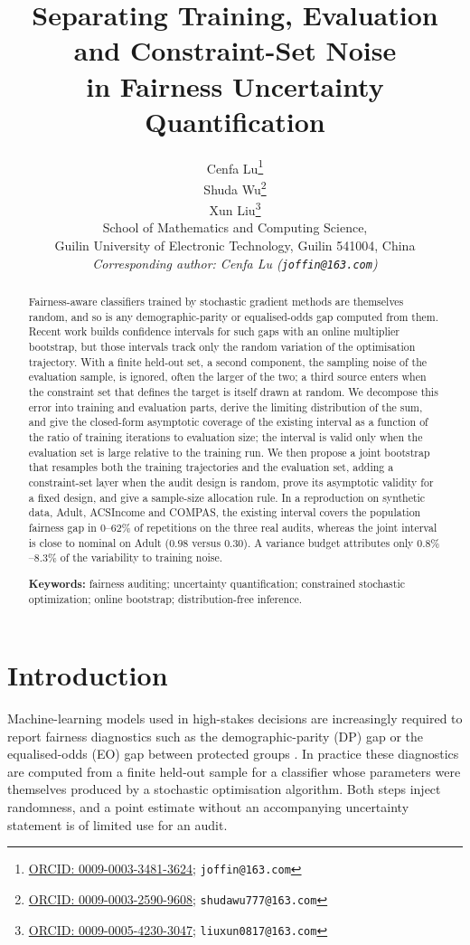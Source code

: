 \documentclass[11pt]{article}
\title{Separating Training, Evaluation and Constraint-Set Noise\\in Fairness Uncertainty Quantification}
\author{Cenfa Lu\thanks{\href{https://orcid.org/0009-0003-3481-3624}{ORCID: 0009-0003-3481-3624}; \texttt{joffin@163.com}}\\
Shuda Wu\thanks{\href{https://orcid.org/0009-0003-2590-9608}{ORCID: 0009-0003-2590-9608}; \texttt{shudawu777@163.com}}\\
Xun Liu\thanks{\href{https://orcid.org/0009-0005-4230-3047}{ORCID: 0009-0005-4230-3047}; \texttt{liuxun0817@163.com}}\\
School of Mathematics and Computing Science,\\
Guilin University of Electronic Technology, Guilin 541004, China\\
\textit{Corresponding author: Cenfa Lu (\texttt{joffin@163.com})}}
\date{}
\begin{document}
\maketitle

\begin{abstract}
Fairness-aware classifiers trained by stochastic gradient methods are themselves random, and so is any
demographic-parity or equalised-odds gap computed from them.  Recent work builds confidence intervals
for such gaps with an online multiplier bootstrap, but those intervals track only the random variation
of the optimisation trajectory.  With a finite held-out set, a second component, the sampling noise of
the evaluation sample, is ignored, often the larger of the two; a third source enters when
the constraint set that defines the target is itself drawn at random.  We decompose this error into training and evaluation parts, derive the limiting distribution of the sum, and give the closed-form asymptotic coverage of the existing interval as a function of the ratio of
training iterations to evaluation size; the interval is valid only when the evaluation set is large
relative to the training run.  We then propose a joint bootstrap that resamples both the training
trajectories and the evaluation set, adding a constraint-set layer when the audit design is random,
prove its asymptotic validity for a fixed design, and give a sample-size allocation rule.  In a
reproduction on synthetic data, Adult, ACSIncome and COMPAS, the existing interval covers the population fairness gap in $0$--$62\%$ of repetitions on the three real audits, whereas the joint interval is close to nominal on Adult ($0.98$ versus $0.30$).  A variance budget attributes only $0.8\%$--$8.3\%$ of the variability to training noise.

\par\medskip\noindent\textbf{Keywords:} fairness auditing; uncertainty quantification; constrained stochastic optimization; online bootstrap; distribution-free inference.
\end{abstract}

\section{Introduction}
\label{sec:intro}

Machine-learning models used in high-stakes decisions are increasingly required to report fairness
diagnostics such as the demographic-parity (DP) gap or the equalised-odds (EO) gap between protected
groups \citep{hardt2016,corbett2017}.  In practice these diagnostics are computed from a finite
held-out sample for a classifier whose parameters were themselves produced by a stochastic
optimisation algorithm.  Both steps inject randomness, and a point estimate without an accompanying uncertainty statement is
of limited use for an audit.
\end{document}
